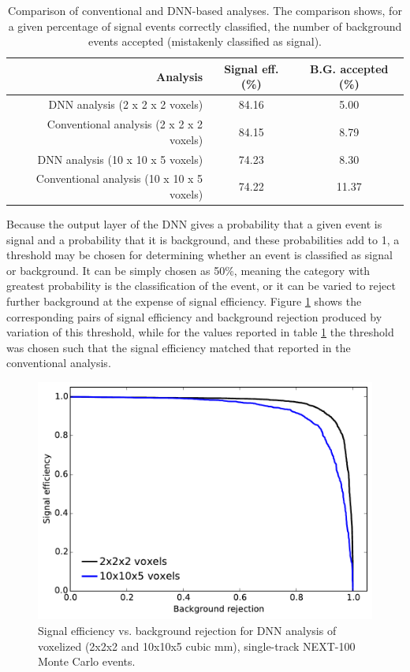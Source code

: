 \documentclass[a4paper,11pt]{article}
\begin{document}
\begin{table}[!htb]
	\begin{center}
		\caption[DNN analysis summary]{\label{tbl.DNNcomparison}Comparison of conventional and DNN-based analyses.  The comparison shows, for a given percentage of signal events
			correctly classified, the number of background events accepted (mistakenly classified as signal).}
		\begin{tabular}{rcc}
			\\
			\textbf{Analysis} & \textbf{Signal eff. (\%)} & \textbf{B.G. accepted (\%)}\\
			\hline
			DNN analysis (2 x 2 x 2 voxels) & 84.16 & 5.00\\
			Conventional analysis (2 x 2 x 2 voxels) & 84.15 & 8.79\\
			\hline
			DNN analysis (10 x 10 x 5 voxels) & 74.23 & 8.30\\
			Conventional analysis (10 x 10 x 5 voxels) & 74.22 & 11.37\\
		\end{tabular}
	\end{center}
\end{table}

Because the output layer of the DNN gives a probability that a given event is signal and a probability that it is background, and these probabilities add to 1, a threshold may be 
chosen for determining whether an event is classified as signal or background.  It can be simply chosen as 50\%, meaning the category with greatest probability is the classification of the
event, or it can be varied to reject further background at the expense of signal efficiency.  Figure \ref{fig_svsb} shows the corresponding pairs of signal efficiency and background 
rejection produced by variation of this threshold, while for the values reported in table \ref{tbl.DNNcomparison} the threshold was chosen such that the signal efficiency matched that reported in 
the conventional analysis.

\begin{figure}[!htb]
	\centering
	\includegraphics[scale=0.6]{fig/sigvsbg_DNN.pdf}
	\caption{\label{fig_svsb}Signal efficiency vs. background rejection for DNN analysis of voxelized (2x2x2 and 10x10x5 cubic mm), single-track NEXT-100 Monte Carlo events.}
\end{figure}
\end{document}

